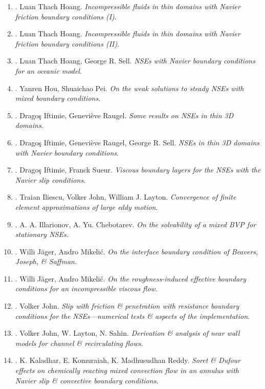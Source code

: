 \documentclass{article}
\begin{document}
\begin{enumerate}
	\item \cite{Hoang2010}. {\sc Luan Thach Hoang}. {\it Incompressible fluids in thin domains with Navier friction boundary conditions (I)}.
	\item \cite{Hoang2013}. {\sc Luan Thach Hoang}. {\it Incompressible fluids in thin domains with Navier friction boundary conditions (II)}.
	\item \cite{Hoang_Sell2010}. {\sc Luan Thach Hoang, George R. Sell}. {\it NSEs with Navier boundary conditions for an oceanic model}.
	\item \cite{Hou_Pei2019}. {\sc Yanren Hou, Shuaichao Pei}. {\it On the weak solutions to steady NSEs with mixed boundary conditions}.
	\item \cite{Iftimie_Raugel2001}. {\sc Drago\c{s} Iftimie, Genevi\`eve Raugel}. {\it Some results on NSEs in thin 3D domains}.
	\item \cite{Iftimie_Raugel_Sell2007}. {\sc Drago\c{s} Iftimie, Genevi\`eve Raugel, George R. Sell}. {\it NSEs in thin 3D domains with Navier boundary conditions}.
	\item \cite{Iftimie_Sueur2011}. {\sc Drago\c{s} Iftimie, Franck Sueur}. {\it Viscous boundary layers for the NSEs with the Navier slip conditions}.
	\item \cite{Iliescu_John_Layton2002}. {\sc Traian Iliescu, Volker John, William J. Layton}. {\it Convergence of finite element approximations of large eddy motion}.
	\item \cite{Illarionov_Chebotarev2001}. {\sc A. A. Illarionov, A. Yu. Chebotarev}. {\it On the solvability of a mixed BVP for stationary NSEs}.
	\item \cite{Jager_Mikelic2000}. {\sc Willi J\"{a}ger, Andro Mikeli\'{c}}. {\it On the interface boundary condition of Beavers, Joseph, \& Saffman}.
	\item \cite{Jager_Mikelic2001}. {\sc Willi J\"{a}ger, Andro Mikeli\'{c}}. {\it On the roughness-induced effective boundary conditions for an incompressible viscous flow}.
	\item \cite{John2002}. {\sc Volker John}. {\it Slip with friction \& penetration with resistance boundary conditions for the NSEs---numerical tests \& aspects of the implementation}.
	\item \cite{John_Layton_Sahin2004}. {\sc Volker John, W. Layton, N. Sahin}. {\it Derivation \& analysis of near wall models for channel \& recirculating flows}.
	\item \cite{Kaladhar_Komuraiah_Madhusudhan-Reddy2019}. {\sc K. Kaladhar, E. Komuraiah, K. Madhusudhan Reddy}. {\it Soret \& Dufour effects on chemically reacting mixed convection flow in an annulus with {N}avier slip \& convective boundary conditions}.

\end{enumerate}
\end{document}

